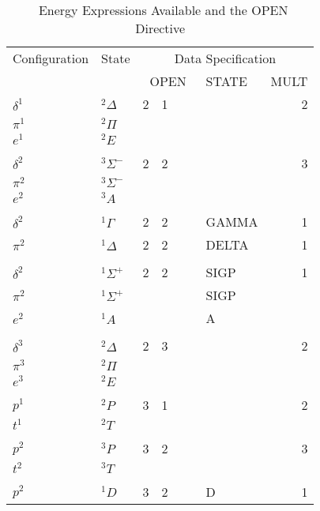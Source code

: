 \documentclass[11pt,fleqn]{article}
\begin{document}
 
\begin{table}
 \caption{\label{table:1}\ Energy Expressions Available and
   the OPEN Directive}
 
 \begin{centering}
 \begin{tabular}{lllllllr}
 \\ \hline\hline
Configuration &  State   & \multicolumn{6}{c}{Data Specification}\\
         \cline{3-8}
   & & \multicolumn{4}{c}{OPEN} & STATE  & MULT   \\ \cline{3-8}

 $\delta^{1}$   &   $^{2}\Delta$   &    2 & 1  & &  & &   2\\
 $\pi^{1}$      &  $^{2}\Pi$  \\
 $e^{1}$        &  $^{2}E$    \\
\\ 
 $\delta^{2}$   & $^{3}\Sigma^{-}$  &  2 & 2   & & & & 3 \\
 $\pi^{2}$   & $^{3}\Sigma^{-}$  \\
 $e^{2}$   & $^{3}A$  \\
\\
 $\delta^{2}$   & $^{1}\Gamma$   &   2 & 2   & & &   GAMMA &  1 \\
 $\pi^{2}$   & $^{1}\Delta$   &   2 & 2   & & &   DELTA &  1 \\
\\
 $\delta^{2}$   & $^{1}\Sigma^{+}$   &   2 & 2   & & &   SIGP &  1 \\
 $\pi^{2}$   & $^{1}\Sigma^{+}$      &     &     & & &   SIGP  \\
 $e^{2}$   & $^{1}A$                 &     &     & & &  A  \\
\\
 $\delta^{3}$   & $^{2}\Delta$       &   2 & 3   & & &   &  2 \\
 $\pi^{3}$   & $^{2}\Pi$   \\
 $e^{3}$   & $^{2}E$   \\
\\
 $p^{1}$   & $^{2}P$                 &   3 & 1   & & &   &  2 \\
 $t^{1}$   & $^{2}T$   \\
\\
 $p^{2}$   & $^{3}P$                 &   3 & 2   & & &   &  3 \\
 $t^{2}$   & $^{3}T$   \\
\\
 $p^{2}$   & $^{1}D$                 &   3 & 2   & & & D &  1 \\

\end{tabular}
\end{centering}
\end{table}
\end{document}
